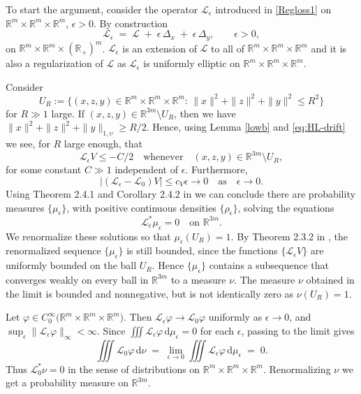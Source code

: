 \documentclass[11pt, a4paper,leqno]{amsart}
\theoremstyle{definition}
\numberwithin{equation}{section}
\newcommand{\R}{\mathbb R}
\begin{document}
 To start the argument, consider the operator $\mathcal{L}_\epsilon$ introduced in \eqref{Regloss1} on $\R^m\times\R^m\times\R^m$, $\epsilon>0$. By construction
\[
\mathcal{L}_\epsilon \;=\; \mathcal{L} \;+\; \epsilon\,\Delta_x\;+\; \epsilon\,\Delta_y,\qquad \epsilon>0,
\]
on $\R^m\times\R^m\times(\R_+)^m$. $\mathcal{L}_\epsilon$ is an extension of $\mathcal{L}$ to all of $\R^m\times\R^m\times\R^m$  and it is also a regularization of $\mathcal{L}$ as $\mathcal{L}_\epsilon$ is uniformly elliptic  on $\R^m\times\R^m\times\R^m$.









Consider $$U_R:=\{(x,z,y)\in \R^m\times\R^m\times\R^m:\, \|x\|^2+\|z\|^2+\|y\|^2\leq R^2\}$$ for $R\gg 1$ large. If $(x,z,y)\in \mathbb R^{3m}\setminus U_R$, then we have  $\|x\|^2+\|z\|^2+\|y\|_{1,\upsilon}\geq R/2$. Hence, using Lemma \ref{lowb} and  \eqref{eq:HL-drift} we see, for $R$ large enough, that
$$\mathcal{L}_\epsilon V\leq -C/2\quad\mbox{whenever}\quad (x,z,y)\in \mathbb R^{3m}\setminus U_R,$$
for some constant $C\gg1 $ independent of $\epsilon$. Furthermore,
$$|(\mathcal{L}_\epsilon -\mathcal{L}_0)V|\leq c_V\epsilon \to 0\quad\mbox{as}\quad \epsilon\to 0.$$
Using Theorem 2.4.1 and Corollary 2.4.2 in \cite{BogachevKrylovRoeckner2015} we can conclude there are probability
measures $\{\mu_\epsilon\}$, with positive continuous densities $\{\rho_\epsilon\}$, solving the equations
$$\mathcal{L}_\epsilon^\ast\mu_\epsilon=0\quad\mbox{on $\mathbb R^{3m}$.}$$
 We renormalize these solutions so that $\mu_\epsilon(U_R)=1$. By Theorem 2.3.2 in \cite{BogachevKrylovRoeckner2015}, the renormalized sequence $\{\mu_\epsilon\}$  is still bounded, since the functions
$\{\mathcal{L}_\epsilon V\}$ are
uniformly bounded on the ball $U_R$. Hence $\{\mu_\epsilon\}$ contains a subsequence that converges
weakly on every ball in $\R^{3m}$ to a  measure $\nu$. The measure $\nu$ obtained in the limit is bounded and
nonnegative, but is not identically zero as $\nu(U_R) = 1$.

Let $\varphi\in C_0^\infty\big(\R^m\times\R^m\times\R^m\big)$. Then $\mathcal L_\epsilon\varphi\to \mathcal L_0\varphi$ uniformly as $\epsilon\to 0$,
and $\sup_\epsilon \|\mathcal L_\epsilon\varphi\|_\infty<\infty$. Since $\iiint \mathcal L_\epsilon\varphi\,\mathrm d\mu_\epsilon=0$ for each $\epsilon$,
passing to the limit gives
\begin{equation}\label{watt}
\iiint \mathcal L_0\varphi\,\mathrm d\nu \;=\; \lim_{\epsilon\to0}\iiint \mathcal L_\epsilon\varphi\,\mathrm d\mu_\epsilon \;=\; 0.
\end{equation}
Thus $\mathcal L_0^\ast\nu=0$ in the sense of distributions on
$\R^m\times\R^m\times\R^m$. Renormalizing $\nu$ we get a probability measure on $\R^{3m}$.
\end{document}
